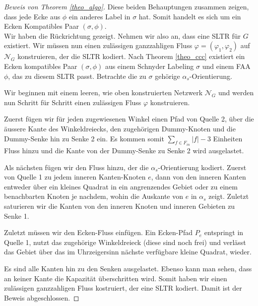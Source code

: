 \begin{proof}[Beweis von Theorem \ref{theo_algo}]
Diese beiden Behauptungen zusammen zeigen, dass jede Ecke aus $\phi$ ein anderes Label in $\sigma$ hat. Somit handelt es sich um ein Ecken Kompatibles Paar $(\sigma,\phi)$.\\

Wir haben die Rückrichtung gezeigt. Nehmen wir also an, dass eine SLTR für $G$ existiert. Wir müssen nun einen zulässigen ganzzahligen Fluss $\varphi=(\varphi_1,\varphi_2)$ auf $\mathcal{N}_G$ konstruieren, der die SLTR kodiert. Nach Theorem \ref{theo_ccc} existiert ein Ecken kompatibles Paar $(\sigma,\phi)$ aus einem Schnyder Labeling $\sigma$ und einem FAA $\phi$, das zu diesem SLTR passt. Betrachte die zu $\sigma$ gehörige $\alpha_s$-Orientierung.

Wir beginnen mit einem leeren, wie oben konstruierten Netzwerk $\mathcal{N}_G$ und werden nun Schritt für Schritt einen zulässigen Fluss $\varphi$ konstruieren.

Zuerst fügen wir für jeden zugewiesenen Winkel einen Pfad von Quelle 2, über die äussere Kante des Winkeldreiecks, den zugehörigen Dummy-Knoten und die Dummy-Senke hin zu Senke 2 ein. Es kommen somit $\sum_{f \in F_{in}}|f|-3$ Einheiten Fluss hinzu und die Kante von der Dummy-Senke zu Senke 2 wird ausgelastet.

Als nächsten fügen wir den Fluss hinzu, der die $\alpha_s$-Orientierung kodiert. Zuerst von Quelle 1 zu jedem inneren Kanten-Knoten $e$, dann von den inneren Kanten entweder über ein kleines Quadrat in ein angrenzendes Gebiet oder zu einem benachbarten Knoten je nachdem, wohin die Auskante von $e$ in $\alpha_s$ zeigt. Zuletzt saturieren wir die Kanten von den inneren Knoten und inneren Gebieten zu Senke 1.

Zuletzt müssen wir den Ecken-Fluss einfügen. Ein Ecken-Pfad $P_e$ entspringt in Quelle 1, nutzt das zugehörige Winkeldreieck (diese sind noch frei) und verlässt das Gebiet über das im Uhrzeigersinn nächste verfügbare kleine Quadrat, wieder. 

Es sind alle Kanten hin zu den Senken ausgelastet. Ebenso kann man sehen, dass an keiner Kante die Kapazität überschritten wird. Somit haben wir einen zulässigen ganzzahligen Fluss kostruiert, der eine SLTR kodiert. Damit ist der Beweis abgeschlossen.

\end{proof}


